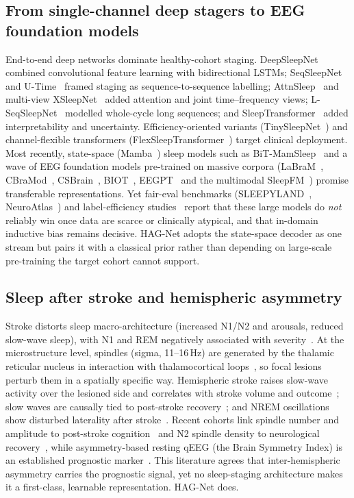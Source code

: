 \documentclass[journal]{IEEEtran}
\begin{document}
\subsection{From single-channel deep stagers to EEG foundation models}
End-to-end deep networks dominate healthy-cohort staging.
DeepSleepNet~\cite{supratak2017deepsleepnet} combined convolutional feature
learning with bidirectional LSTMs; SeqSleepNet~\cite{phan2019seqsleepnet} and
U-Time~\cite{perslev2019utime} framed staging as sequence-to-sequence labelling;
AttnSleep~\cite{eldele2021attnsleep} and multi-view
XSleepNet~\cite{phan2021xsleepnet} added attention and joint time--frequency
views; L-SeqSleepNet~\cite{lseqsleepnet2023} modelled whole-cycle long sequences;
and SleepTransformer~\cite{sleeptransformer2022} added interpretability and
uncertainty. Efficiency-oriented variants
(TinySleepNet~\cite{supratak2020tinysleepnet}) and channel-flexible transformers
(FlexSleepTransformer~\cite{guo2024flexsleep}) target clinical deployment. Most
recently, state-space (Mamba~\cite{gu2023mamba}) sleep models such as
BiT-MamSleep~\cite{bitmamsleep2024} and a wave of EEG foundation models
pre-trained on massive corpora (LaBraM~\cite{labram2024},
CBraMod~\cite{cbramod2025}, CSBrain~\cite{csbrain2025},
BIOT~\cite{biot2023}, EEGPT~\cite{eegpt2024} and the multimodal
SleepFM~\cite{sleepfm2026}) promise transferable representations. Yet fair-eval
benchmarks (SLEEPYLAND~\cite{sleepyland2026}, NeuroAtlas~\cite{neuroatlas2026}) and
label-efficiency studies~\cite{estevan2025ssl} report that these large models do
\emph{not} reliably win once data are scarce or clinically atypical, and that
in-domain inductive bias remains decisive. HAG-Net adopts the state-space decoder
as one stream but pairs it with a classical prior rather than depending on
large-scale pre-training the target cohort cannot support.

\subsection{Sleep after stroke and hemispheric asymmetry}
Stroke distorts sleep macro-architecture (increased N1/N2 and arousals, reduced
slow-wave sleep), with N1 and REM negatively associated with
severity~\cite{bassetti2006sleep}. At the microstructure level, spindles (sigma,
11--16\,Hz) are generated by the thalamic reticular nucleus in interaction with
thalamocortical loops~\cite{fernandez2019spindles}, so focal lesions perturb them
in a spatially specific way. Hemispheric stroke raises slow-wave activity over the
lesioned side and correlates with stroke volume and
outcome~\cite{gottselig2002stroke}; slow waves are causally tied to post-stroke
recovery~\cite{facchin2020slowwaves}; and NREM oscillations show disturbed
laterality after stroke~\cite{simpson2023laterality}. Recent cohorts link spindle
number and amplitude to post-stroke cognition~\cite{zheng2025spindles} and N2
spindle density to neurological recovery~\cite{jing2025cpap}, while
asymmetry-based resting qEEG (the Brain Symmetry Index) is an established
prognostic marker~\cite{anastasi2017bsi}. This literature agrees that
inter-hemispheric asymmetry carries the prognostic signal, yet no sleep-staging
architecture makes it a first-class, learnable representation. HAG-Net does.
\end{document}
